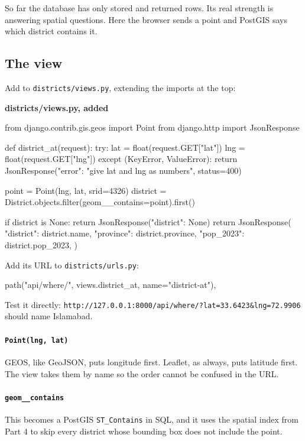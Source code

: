 \documentclass{article}
\newcommand{\cd}[1]{\texttt{#1}}
\newcommand{\cdb}[1]{\nolinkurl{#1}}
\newcommand{\codecap}[1]{%
  \par\vspace{.9em}\noindent\textbf{#1}\par\vspace{-.6em}}
\begin{document}
So far the database has only stored and returned rows. Its real
strength is answering spatial questions. Here the browser sends a point
and PostGIS says which district contains it.

\subsection{The view}

Add to \cd{districts/views.py}, extending the imports at the top:

\codecap{districts/views.py, added}
\begin{code}
from django.contrib.gis.geos import Point
from django.http import JsonResponse


def district_at(request):
    try:
        lat = float(request.GET["lat"])
        lng = float(request.GET["lng"])
    except (KeyError, ValueError):
        return JsonResponse({"error": "give lat and lng as numbers"}, status=400)

    point = Point(lng, lat, srid=4326)
    district = District.objects.filter(geom__contains=point).first()

    if district is None:
        return JsonResponse({"district": None})
    return JsonResponse({
        "district": district.name,
        "province": district.province,
        "pop_2023": district.pop_2023,
    })
\end{code}

Add its URL to \cd{districts/urls.py}:

\begin{code}
    path("api/where/", views.district_at, name="district-at"),
\end{code}

Test it directly: \cdb{http://127.0.0.1:8000/api/where/?lat=33.6423&lng=72.9906}
should name Islamabad.

\paragraph{\texttt{Point(lng, lat)}}
GEOS, like GeoJSON, puts longitude first. Leaflet, as always, puts
latitude first. The view takes them by name so the order cannot be
confused in the URL.

\paragraph{\texttt{geom\_\_contains}}
This becomes a PostGIS \cd{ST\_Contains} in SQL, and it uses the spatial
index from Part 4 to skip every district whose bounding box does not
include the point.
\end{document}
